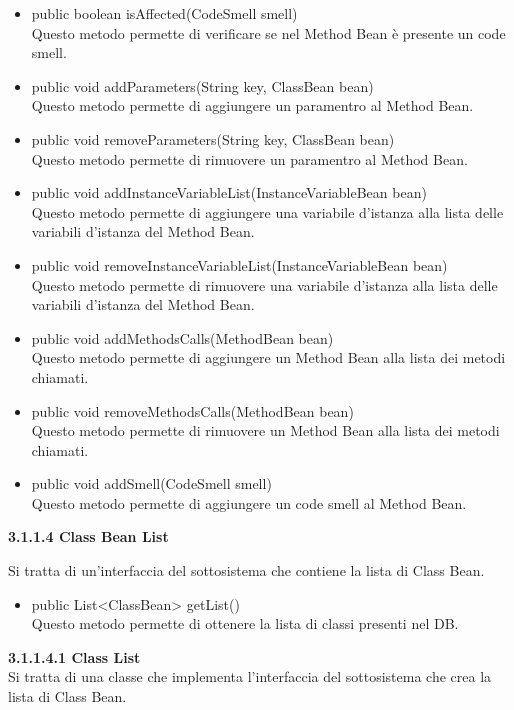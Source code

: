 \documentclass[11pt]{article}
\begin{document}
\begin{description}
				\begin{itemize}
					\item public boolean isAffected(CodeSmell smell)\\
					Questo metodo permette di verificare se nel Method Bean è presente un code smell.
					\item public void addParameters(String key, ClassBean bean)\\
					Questo metodo permette di aggiungere un paramentro al Method Bean.
					\item public void removeParameters(String key, ClassBean bean)\\
					Questo metodo permette di rimuovere un paramentro al Method Bean.
					\item public void addInstanceVariableList(InstanceVariableBean bean)\\
					Questo metodo permette di aggiungere una variabile d'istanza alla lista delle variabili d'istanza del Method Bean.
					\item public void removeInstanceVariableList(InstanceVariableBean bean)\\
					Questo metodo permette di rimuovere una variabile d'istanza alla lista delle variabili d'istanza del Method Bean.
					\item  public void addMethodsCalls(MethodBean bean)\\
					Questo metodo permette di aggiungere un Method Bean alla lista dei metodi chiamati.
					\item public void removeMethodsCalls(MethodBean bean)\\
					Questo metodo permette di rimuovere un Method Bean alla lista dei metodi chiamati.
					\item public void addSmell(CodeSmell smell)\\
					Questo metodo permette di aggiungere un code smell al Method Bean.		 
				\end{itemize}
			\item \textbf{3.1.1.4  Class Bean List} 
			\item Si tratta di un'interfaccia del sottosistema che contiene la lista di Class Bean. 
			
			\begin{itemize}
				\item public List<ClassBean> getList()\\
				Questo metodo permette di ottenere la lista di classi presenti nel DB.
				
			\end{itemize}
				\item \textbf{ 3.1.1.4.1  Class List} \\
				Si tratta di una classe che implementa l'interfaccia del sottosistema che crea la lista di Class Bean.
				

\end{description}
\end{document}
